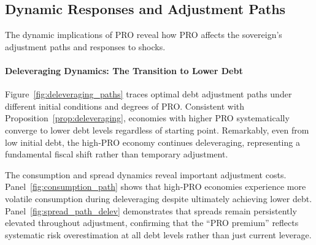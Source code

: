 \documentclass[12pt]{article}
\theoremstyle{plain}
\begin{document}
\subsection{Dynamic Responses and Adjustment Paths}

The dynamic implications of PRO reveal how PRO affects the sovereign's
adjustment paths and responses to shocks.

\paragraph{Deleveraging Dynamics: The Transition to Lower Debt}

Figure~\ref{fig:deleveraging_paths} traces optimal debt adjustment paths under
different initial conditions and degrees of PRO. Consistent with
Proposition~\ref{prop:deleveraging}, economies with higher PRO systematically
converge to lower debt levels regardless of starting point. Remarkably, even
from low initial debt, the high‑PRO economy continues deleveraging,
representing a fundamental fiscal shift rather than temporary adjustment.

The consumption and spread dynamics reveal important adjustment costs.
Panel~\ref{fig:consumption_path} shows that high‑PRO economies experience more
volatile consumption during deleveraging despite ultimately achieving lower
debt. Panel~\ref{fig:spread_path_delev} demonstrates that spreads remain
persistently elevated throughout adjustment, confirming that the ``PRO
premium'' reflects systematic risk overestimation at all debt levels rather
than just current leverage.
\end{document}
